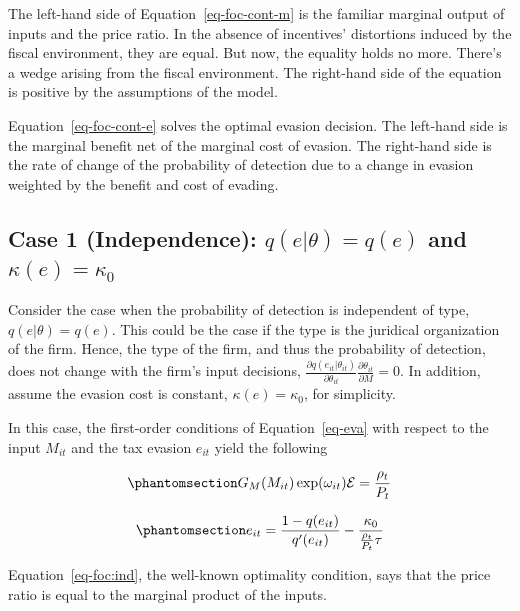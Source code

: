 \documentclass[
  12pt]{article}
\theoremstyle{definition}
\theoremstyle{remark}
\begin{document}
The left-hand side of Equation~\ref{eq-foc-cont-m} is the familiar
marginal output of inputs and the price ratio. In the absence of
incentives' distortions induced by the fiscal environment, they are
equal. But now, the equality holds no more. There's a wedge arising from
the fiscal environment. The right-hand side of the equation is positive
by the assumptions of the model.

Equation~\ref{eq-foc-cont-e} solves the optimal evasion decision. The
left-hand side is the marginal benefit net of the marginal cost of
evasion. The right-hand side is the rate of change of the probability of
detection due to a change in evasion weighted by the benefit and cost of
evading.

\subsection{\texorpdfstring{Case 1 (Independence): \(q(e|\theta)=q(e)\)
and
\(\kappa(e)=\kappa_0\)}{Case 1 (Independence): q(e\textbar\textbackslash theta)=q(e) and \textbackslash kappa(e)=\textbackslash kappa\_0}}\label{case-1-independence-qethetaqe-and-kappaekappa_0}

Consider the case when the probability of detection is independent of
type, \(q(e|\theta)=q(e)\). This could be the case if the type is the
juridical organization of the firm. Hence, the type of the firm, and
thus the probability of detection, does not change with the firm's input
decisions,
\(\frac{\partial q(e_{it}|\theta_{it})}{\partial \theta_{it}}\frac{\partial \theta_{it}}{\partial M}=0\).
In addition, assume the evasion cost is constant,
\(\kappa(e)=\kappa_0\), for simplicity.

In this case, the first-order conditions of Equation~\ref{eq-eva} with
respect to the input \(M_{it}\) and the tax evasion \(e_{it}\) yield the
following

\begin{equation}\phantomsection\label{eq-foc:ind}{
G_M(M_{it})\exp(\omega_{it})\mathcal{E}=\frac{\rho_{t}}{P_t}
}\end{equation}

\begin{equation}\phantomsection\label{eq-foc:eva:ind}{
e_{it}=\frac{1-q(e_{it})}{q'(e_{it})}-\frac{\kappa_0}{\frac{\rho_{t}}{P_t}\tau}
}\end{equation}

Equation~\ref{eq-foc:ind}, the well-known optimality condition, says
that the price ratio is equal to the marginal product of the inputs.
\end{document}
